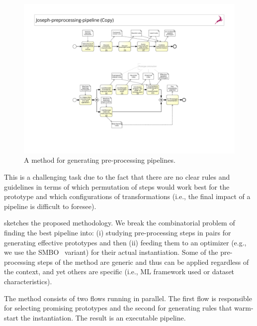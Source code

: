 \begin{figure}[t]
    \centering
    \includegraphics[clip, trim=6.5cm 3.5cm 6.5cm 8cm,width=1.0\textwidth]{chapters/data-centric/supervised/img/bpmn.pdf}
    \caption{A method for generating pre-processing pipelines.}
    \label{fig:methodology}
\end{figure}

This is a challenging task due to the fact that there are no clear rules and guidelines in terms of which permutation of steps would work best for the prototype and which configurations of transformations (i.e., the final impact of a pipeline is difficult to foresee).

 sketches the proposed methodology.
We break the combinatorial problem of finding the best pipeline into: (i) studying pre-processing steps in pairs for generating effective prototypes and then (ii) feeding them to an optimizer (e.g., we use the SMBO~\cite{HyperOptICML13} variant) for their actual instantiation.
Some of the pre-processing steps of the method are generic and thus can be applied regardless of the context, and yet others are specific (i.e., ML framework used or dataset characteristics).

The method consists of two flows running in parallel.
The first flow is responsible for selecting promising prototypes and the second for generating rules that warm-start the instantiation.
The result is an executable pipeline.

